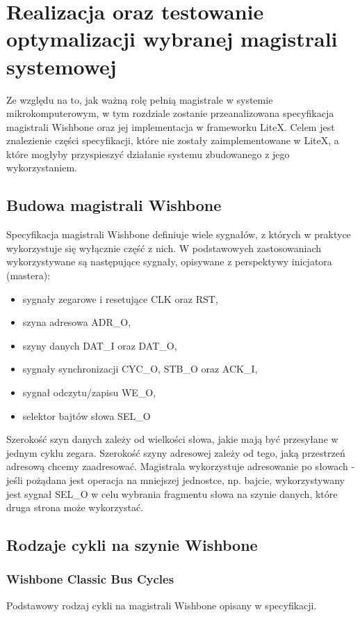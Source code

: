\section{Realizacja oraz testowanie optymalizacji wybranej magistrali systemowej}
Ze względu na to, jak ważną rolę pełnią magistrale w systemie mikrokomputerowym, w tym rozdziale zostanie przeanalizowana specyfikacja magistrali Wishbone oraz jej implementacja w frameworku LiteX. Celem jest znalezienie części specyfikacji, które nie zostały zaimplementowane w LiteX, a które mogłyby przyspieszyć działanie systemu zbudowanego z jego wykorzystaniem.

\subsection{Budowa magistrali Wishbone}
Specyfikacja magistrali Wishbone definiuje wiele sygnałów, z których w praktyce wykorzystuje się wyłącznie część z nich. W podstawowych zastosowaniach wykorzystywane są następujące sygnały, opisywane z perspektywy inicjatora (mastera):
\begin{itemize}
    \item sygnały zegarowe i resetujące CLK oraz RST,
    \item szyna adresowa ADR_O,
    \item szyny danych DAT_I oraz DAT_O,
    \item sygnały synchronizacji CYC_O, STB_O oraz ACK_I,
    \item sygnał odczytu/zapisu WE_O,
    \item selektor bajtów słowa SEL_O
\end{itemize}

Szerokość szyn danych zależy od wielkości słowa, jakie mają być przesyłane w jednym cyklu zegara. Szerokość szyny adresowej zależy od tego, jaką przestrzeń adresową chcemy zaadresować. Magistrala wykorzystuje adresowanie po słowach - jeśli pożądana jest operacja na mniejszej jednostce, np. bajcie, wykorzystywany jest sygnał SEL_O w celu wybrania fragmentu słowa na szynie danych, które druga strona może wykorzystać.

\subsection{Rodzaje cykli na szynie Wishbone}

\subsubsection{Wishbone Classic Bus Cycles}
Podstawowy rodzaj cykli na magistrali Wishbone opisany w specyfikacji.

